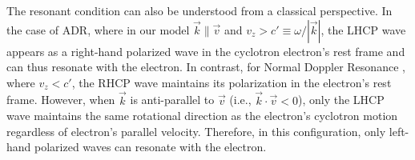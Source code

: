 \documentclass{cpbtex3}
\begin{document}

The resonant condition can also be understood from a classical perspective. In the case of ADR, where in our model $\vec{k} \parallel \vec{v}$ and $v_z > c' \equiv \omega/|\vec{k}|$, the LHCP wave appears as a right-hand polarized wave in the cyclotron electron's rest frame and can thus resonate with the electron. In contrast, for Normal Doppler Resonance , where $v_z < c'$, the RHCP wave maintains its polarization in the electron's rest frame. However, when $\vec{k}$ is anti-parallel to $\vec{v}$ (i.e., $\vec{k} \cdot \vec{v} < 0$), only the LHCP wave maintains the same rotational direction as the electron's cyclotron motion regardless of electron's parallel velocity. Therefore, in this configuration, only left-hand polarized waves can resonate with the electron.
\end{document}
